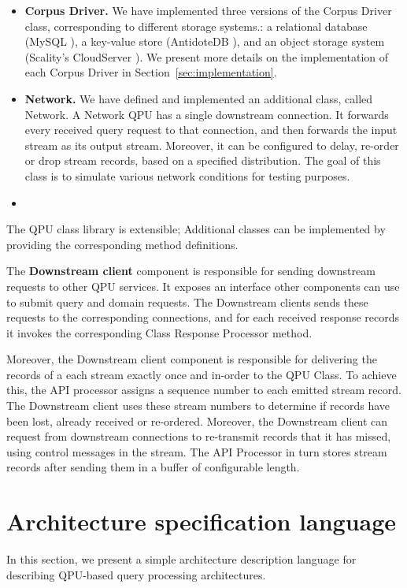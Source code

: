 \begin{itemize}
  \item \textbf{Corpus Driver.}
  We have implemented three versions of the Corpus Driver class, corresponding to different storage systems.:
  a relational database (MySQL \cite{mysql:docs}), a key-value store (AntidoteDB \cite{antidotedb:docs}),
  and an object storage system (Scality's CloudServer \cite{cloudserver:github}).
  We present more details on the implementation of each Corpus Driver in Section~\ref{sec:implementation}.

  \item \textbf{Network.}
  We have defined and implemented an additional class, called Network.
  A Network QPU has a single downstream connection.
  It forwards every received query request to that connection, and then forwards the input stream as its output stream.
  Moreover, it can be configured to delay, re-order or drop stream records, based on a specified distribution.
  The goal of this class is to simulate various network conditions for testing purposes.

  \item {}

\end{itemize}

The QPU class library is extensible;
Additional classes can be implemented by providing the corresponding method definitions.

\medskip
\noindent
The \textbf{Downstream client} component is responsible for sending downstream requests to other QPU services.
It exposes an interface other components can use to submit query and domain requests.
The Downstream clients sends these requests to the corresponding connections,
and for each received response records it invokes the corresponding Class Response Processor method.

Moreover, the Downstream client component is responsible for delivering the records of a each stream exactly once and in-order
to the QPU Class.
To achieve this, the API processor assigns a sequence number to each emitted stream record.
The Downstream client uses these stream numbers to determine if records have been lost, already received or re-ordered.
Moreover, the Downstream client can request from downstream connections to re-transmit records that it has missed,
using control messages in the stream.
The API Processor in turn stores stream records after sending them in a buffer of configurable length.


\section{Architecture specification language}
\label{sec:spec_language}
In this section, we present a simple architecture description language for describing QPU-based query processing architectures.

